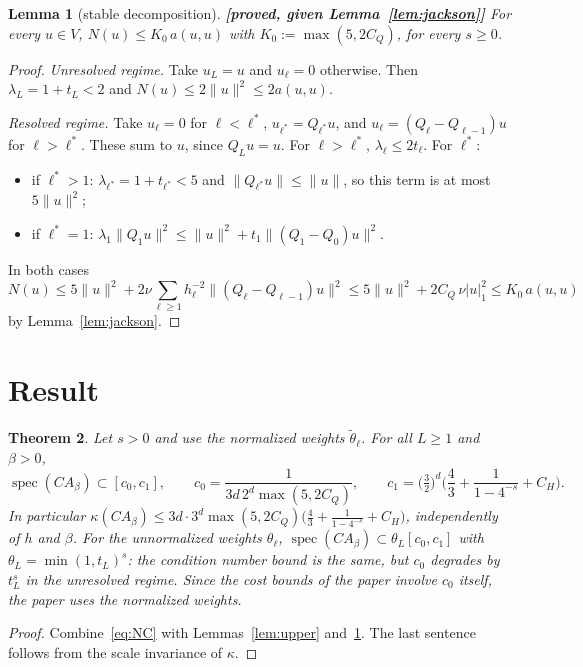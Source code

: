 \documentclass[11pt,a4paper]{article}
\newtheorem{theorem}{Theorem}
\newtheorem{lemma}[theorem]{Lemma}
\theoremstyle{remark}
\begin{document}
\begin{lemma}[stable decomposition]\label{lem:lower}\textbf{[proved, given Lemma~\ref{lem:jackson}]}
For every $u\in V$, $N(u)\le K_0\,a(u,u)$ with $K_0:=\max(5,2C_Q)$, for every
$s\ge0$.
\end{lemma}
\begin{proof}
\emph{Unresolved regime.} Take $u_L=u$ and $u_\ell=0$ otherwise. Then $\lambda_L=1+t_L<2$
and $N(u)\le2\|u\|^2\le2a(u,u)$.

\emph{Resolved regime.} Take $u_\ell=0$ for $\ell<\ell^*$, $u_{\ell^*}=Q_{\ell^*}u$, and
$u_\ell=(Q_\ell-Q_{\ell-1})u$ for $\ell>\ell^*$. These sum to $u$, since $Q_L u=u$. For $\ell>\ell^*$,
$\lambda_\ell\le2t_\ell$. For $\ell^*$:
\begin{itemize}
\item if $\ell^*>1$: $\lambda_{\ell^*}=1+t_{\ell^*}<5$ and $\|Q_{\ell^*}u\|\le\|u\|$, so this term is at most
  $5\|u\|^2$;
\item if $\ell^*=1$: $\lambda_1\|Q_1u\|^2\le\|u\|^2+t_1\|(Q_1-Q_0)u\|^2$.
\end{itemize}
In both cases
\[
N(u)\le5\|u\|^2+2\nu\sum_{\ell\ge1}h_\ell^{-2}\|(Q_\ell-Q_{\ell-1})u\|^2\le5\|u\|^2+2C_Q\,\nu|u|_1^2\le K_0\,a(u,u)
\]
by Lemma~\ref{lem:jackson}.
\end{proof}

\section{Result}

\begin{theorem}\label{thm:robust}
Let $s>0$ and use the normalized weights $\tilde\theta_\ell$. For all $L\ge1$ and
$\beta>0$,
\[
\operatorname{spec}(CA_\beta)\subset[c_0,c_1],\qquad c_0=\frac1{3d\,2^d\max(5,2C_Q)},\qquad
c_1=\big(\tfrac32\big)^d\Big(\frac43+\frac1{1-4^{-s}}+C_H\Big).
\]
In particular $\kappa(CA_\beta)\le3d\cdot3^d\max(5,2C_Q)\big(\frac43+\frac1{1-4^{-s}}+C_H\big)$,
independently of $h$ and $\beta$. For the unnormalized weights $\theta_\ell$,
$\operatorname{spec}(CA_\beta)\subset\theta_L[c_0,c_1]$ with $\theta_L=\min(1,t_L)^s$: the condition number
bound is the same, but $c_0$ degrades by $t_L^s$ in the unresolved regime.
Since the cost bounds of the paper involve $c_0$ itself, the paper uses the
normalized weights.
\end{theorem}
\begin{proof}
Combine~\eqref{eq:NC} with Lemmas~\ref{lem:upper} and~\ref{lem:lower}. The
last sentence follows from the scale invariance of $\kappa$.
\end{proof}
\end{document}

